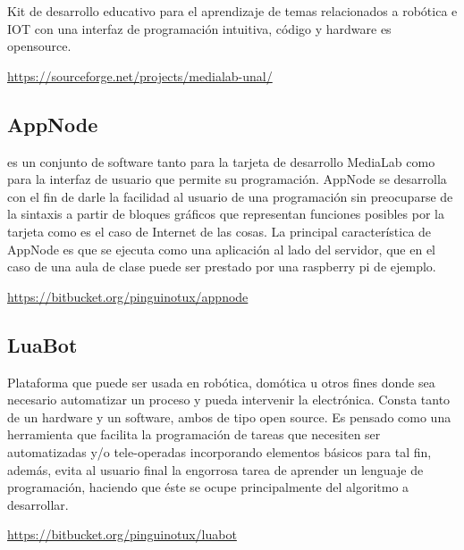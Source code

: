 Kit de desarrollo educativo para el aprendizaje de temas relacionados a robótica e IOT con una interfaz de programación intuitiva,
código y hardware es opensource.

\url{https://sourceforge.net/projects/medialab-unal/} 

\subsection*{AppNode}

es un conjunto de software tanto para la tarjeta de desarrollo MediaLab como para la interfaz
de usuario que permite su programación. AppNode se desarrolla con el fin de darle la facilidad al usuario
de una programación sin preocuparse de la sintaxis a partir de bloques gráficos que representan funciones
posibles por la tarjeta como es el caso de Internet de las cosas. La principal característica de AppNode
es que se ejecuta como una aplicación al lado del servidor, que en el caso de una aula de clase puede
ser prestado por una raspberry pi de ejemplo.

\url{https://bitbucket.org/pinguinotux/appnode}

\subsection*{LuaBot}

Plataforma que puede ser usada en robótica, domótica u otros fines
donde sea necesario automatizar un proceso y pueda intervenir la electrónica.
Consta tanto de un hardware y un software, ambos de tipo open source. Es
pensado como una herramienta que facilita la programación de tareas que
necesiten ser automatizadas y/o tele-operadas incorporando elementos básicos
para tal fin, además, evita al usuario final la engorrosa tarea de aprender
un lenguaje de programación, haciendo que éste se ocupe principalmente del
algoritmo a desarrollar.

\url{https://bitbucket.org/pinguinotux/luabot} 


